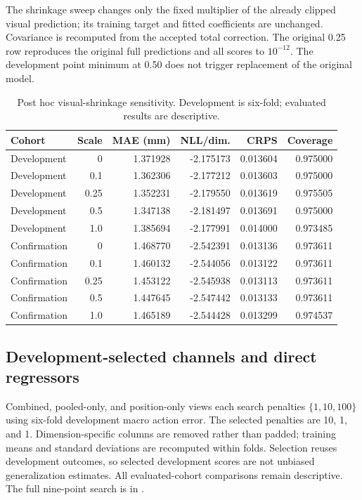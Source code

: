 The shrinkage sweep changes only the fixed multiplier of the already clipped visual prediction; its training target and fitted coefficients are unchanged. Covariance is recomputed from the accepted total correction. The original 0.25 row reproduces the original full predictions and all scores to $10^{-12}$. The development point minimum at 0.50 does not trigger replacement of the original model.
\begin{table}[htbp]\centering\small
\caption{Post hoc visual-shrinkage sensitivity. Development is six-fold; evaluated results are descriptive.}\label{tab:ext_shrink}
\begin{tabular}{lrrrrr}\toprule
Cohort & Scale & MAE (mm) & NLL/dim. & CRPS & Coverage\\\midrule
Development & 0 & 1.371928 & -2.175173 & 0.013604 & 0.975000\\
Development & 0.1 & 1.362306 & -2.177212 & 0.013603 & 0.975000\\
Development & 0.25 & 1.352231 & -2.179550 & 0.013619 & 0.975505\\
Development & 0.5 & 1.347138 & -2.181497 & 0.013691 & 0.975000\\
Development & 1.0 & 1.385694 & -2.177991 & 0.014000 & 0.973485\\
Confirmation & 0 & 1.468770 & -2.542391 & 0.013136 & 0.973611\\
Confirmation & 0.1 & 1.460132 & -2.544056 & 0.013122 & 0.973611\\
Confirmation & 0.25 & 1.453122 & -2.545938 & 0.013113 & 0.973611\\
Confirmation & 0.5 & 1.447645 & -2.547442 & 0.013133 & 0.973611\\
Confirmation & 1.0 & 1.465189 & -2.544428 & 0.013299 & 0.974537\\
\bottomrule\end{tabular}
\end{table}
\subsection{Development-selected channels and direct regressors}
Combined, pooled-only, and position-only views each search penalties $\{1,10,100\}$ using six-fold development macro action error. The selected penalties are 10, 1, and 1. Dimension-specific columns are removed rather than padded; training means and standard deviations are recomputed within folds. Selection reuses development outcomes, so selected development scores are not unbiased generalization estimates. All evaluated-cohort comparisons remain descriptive. The full nine-point search is in .

